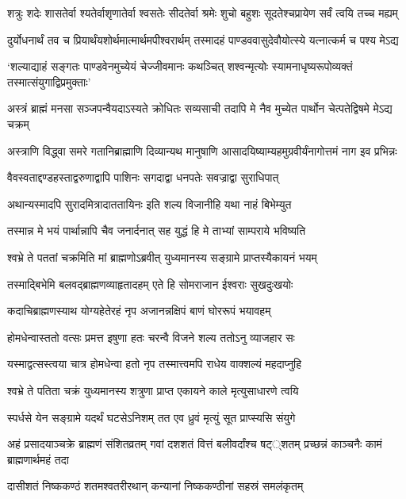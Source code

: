 \twolineshloka
{शत्रुः शदेः शासतेर्वा श्यतेर्वाशृणातेर्वा श्वसतेः सीदतेर्वा}
{श्रमेः शुचो बहुशः सूदतेश्चप्रायेण सर्वं त्वयि तच्च मह्यम्}


\twolineshloka
{दुर्योधनार्थं तव च प्रियार्थंयशोर्थमात्मार्थमपीश्वरार्थम्}
{तस्मादहं पाण्डववासुदेवौयोत्स्ये यत्नात्कर्म च पश्य मेऽद्य}


\twolineshloka
{`शल्याद्याहं सङ्गतः पाण्डवेनमुच्येयं चेज्जीवमानः कथञ्चित्}
{शश्वन्मृत्योः स्यामनाधृष्यरूपोव्यक्तं तस्मात्संयुगाद्विप्रमुक्ताः'}


\twolineshloka
{अस्त्रं ब्राह्मं मनसा सञ्जपन्वैयदाऽस्यते क्रोधितः सव्यसाची}
{तदापि मे नैव मुच्येत पार्थोन चेत्पतेद्विषमे मेऽद्य चक्रम्}


\twolineshloka
{अस्त्राणि विद्ध्वा समरे गतानिब्राह्माणि दिव्यान्यथ मानुषाणि}
{आसादयिष्याम्यहमुग्रवीर्यंनागोत्तमं नाग इव प्रभिन्नः}


\twolineshloka
{वैवस्वताद्दण्डहस्ताद्वरुणाद्वापि पाशिनः}
{सगदाद्वा धनपतेः सवज्राद्वा सुराधिपात्}


\twolineshloka
{अथान्यस्मादपि सुरादमित्रादाततायिनः}
{इति शल्य विजानीहि यथा नाहं बिभेम्युत}


\twolineshloka
{तस्मान्न मे भयं पार्थान्नापि चैव जनार्दनात्}
{सह युद्धं हि मे ताभ्यां साम्पराये भविष्यति}


\twolineshloka
{श्वभ्रे ते पततां चक्रमिति मां ब्राह्मणोऽब्रवीत्}
{युध्यमानस्य सङ्ग्रामे प्राप्तस्यैकायनं भयम्}


\twolineshloka
{तस्माद्बिभेमि बलवद्ब्राह्मणव्याहृतादहम्}
{एते हि सोमराजान ईश्वराः सुखदुःखयोः}


\twolineshloka
{कदाचिब्राह्मणस्याथ योग्यहेतेरहं नृप}
{अजानन्नक्षिपं बाणं घोररूपं भयावहम्}


\twolineshloka
{होमधेन्वास्ततो वत्सः प्रमत्त इषुणा हतः}
{चरन्वै विजने शल्य ततोऽनु व्याजहार सः}


\twolineshloka
{यस्माद्वत्सस्त्वया चात्र होमधेन्वा हतो नृप}
{तस्मात्त्वमपि राधेय वाक्शल्यं महदाप्नुहि}


\twolineshloka
{श्वभ्रे ते पतिता चक्रं युध्यमानस्य शत्रुणा}
{प्राप्त एकायने काले मृत्युसाधारणे त्वयि}


\twolineshloka
{स्पर्धसे येन सङ्ग्रामे यदर्थं घटसेऽनिशम्}
{तत एव ध्रुवं मृत्युं सूत प्राप्स्यसि संयुगे}


अहं प्रसादयाञ्चक्रे ब्राह्मणं संशितव्रतम्
\twolineshloka
{गवां दशशतं वित्तं बलीवर्दांश्च षट््शतम्}
{प्रच्छन्नं काञ्चनैः कामं ब्राह्मणार्थमहं तदा}


\twolineshloka
{दासीशतं निष्ककण्ठं शतमश्वतरीरथान्}
{कन्यानां निष्ककण्ठीनां सहस्रं समलंकृतम्}


